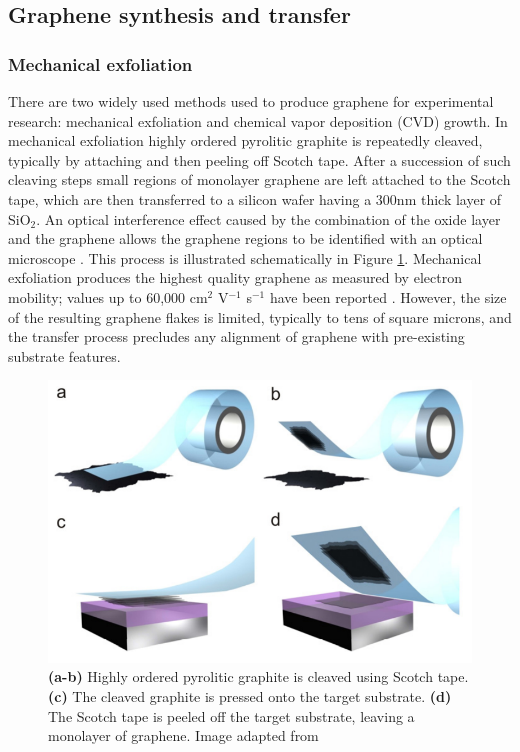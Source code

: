 \documentclass[edeposit,fullpage,draftthesis]{uiucthesis2009}
\begin{document}
        \subsection{Graphene synthesis and transfer}
        
        
            \subsubsection{Mechanical exfoliation}
            
            There are two widely used methods used to produce graphene for 
        experimental research: mechanical exfoliation\cite{novoselov2004electric} and chemical vapor
        deposition (CVD) growth\cite{li2009large}. In mechanical exfoliation highly ordered
        pyrolitic graphite is repeatedly cleaved, typically by attaching and 
        then peeling off Scotch tape. After a succession of such cleaving steps
        small regions of monolayer graphene are left attached to the Scotch
        tape, which are then transferred to a silicon wafer having a 300nm
        thick layer of SiO$_2$. An optical interference effect caused by the 
        combination of the oxide layer and the graphene allows the graphene
        regions to be identified with an optical microscope \cite{Blake2007}.
        This process is illustrated schematically in Figure \ref{fig:exfoliation}.
        Mechanical exfoliation produces the highest quality graphene as
        measured by electron mobility; values up to 60,000 cm$^2$ V$^{-1}$
        s$^{-1}$ have been reported \cite{Dean2010}. However, the size of the 
        resulting graphene flakes is limited, typically to tens of square
        microns, and the transfer process precludes any alignment of graphene
        with pre-existing substrate features.
        
            \begin{figure}
            \centering
            \includegraphics[width=0.6\linewidth]{images/experimentaltechniques/exfoliation.png}
            \caption[Mechanical exfoliation of graphene]{
                \textbf{(a-b)} Highly ordered pyrolitic graphite is cleaved using Scotch tape.
                \textbf{(c)} The cleaved graphite is pressed onto the target substrate.
                \textbf{(d)} The Scotch tape is peeled off the target substrate, leaving a monolayer of graphene.
                Image adapted from \cite{novoselov2012two}}
            \label{fig:exfoliation}
            \end{figure}
\end{document}
